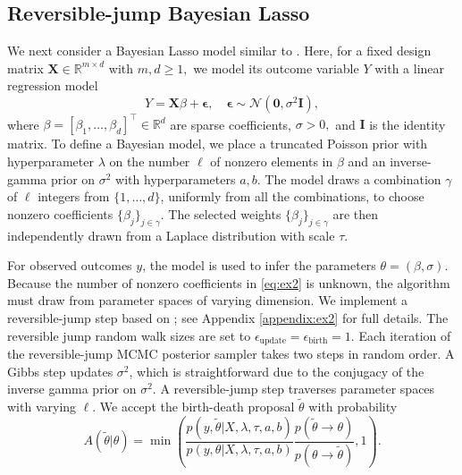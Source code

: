 \documentclass{article}
\begin{document}
\subsection{Reversible-jump Bayesian Lasso}
\label{section:ex2}
We next consider a Bayesian Lasso model similar to \cite{chen_bayesian_2011}. 
Here, for a fixed design matrix $\mathbf{X}\in \mathbb{R}^{m\times d}$ with $m, d \geq 1,$ we model its outcome variable $Y$ with  
a linear regression model
\begin{equation}
    Y = \mathbf{X}{\beta} + \mathbf{\epsilon}, \quad \mathbf{\epsilon} \sim \mathcal{N}(\mathbf{0}, \sigma^{2} \mathbf{I}), 
    \label{eq:ex2}
\end{equation}
where ${\beta} = [\beta_1, \dots, \beta_d]^{\top} \in \mathbb{R}^d$ are sparse coefficients, $\sigma>0,$ and $\mathbf{I}$ is the identity matrix. 
To define a Bayesian model, we place a truncated Poisson prior with hyperparameter $\lambda$ on the number $\ell$ of nonzero elements in $\beta$ and an inverse-gamma prior on $\sigma^{2}$ with hyperparameters $a, b$. 
The model draws a combination $\gamma$ of $\ell$ integers from $\{1,\dots, d\}$, uniformly from all the combinations, to choose nonzero coefficients $\{\beta_{j}\}_{j\in \gamma}$.
The selected weights $\{\beta_{j}\}_{j\in \gamma}$ are then independently drawn from a Laplace distribution with scale $\tau$. 

For observed outcomes $y$, the model is used to infer the parameters $\theta = (\beta, \sigma)$.
Because the number of nonzero coefficients in \eqref{eq:ex2} is unknown, the algorithm must draw from parameter spaces of varying dimension. 
We implement a reversible-jump step \citep{green_reversible_1995} based on \cite{chen_bayesian_2011}; see Appendix \ref{appendix:ex2} for full details. 
The reversible jump random walk sizes are set to $\epsilon_\text{update}= \epsilon_\text{birth}=1$. Each iteration of the reversible-jump MCMC posterior sampler takes two steps in random order. A Gibbs step updates $\sigma^{2}$, which is straightforward due to the conjugacy of the inverse gamma prior on $\sigma^{2}$. A reversible-jump step traverses parameter spaces with varying $\ell$. 
We accept the birth-death proposal $\tilde{\theta}$ with probability 
\begin{equation}
    A(\tilde{\theta}|\theta) = \min{\left(\frac{p(y, \tilde{\theta} | X, \lambda, \tau, a, b)}{p(y, \theta | X, \lambda, \tau, a, b )} \frac{p(\tilde{\theta} \rightarrow \theta)}{p(\theta \rightarrow \tilde{\theta})}, 1\right)}.
\end{equation}
\end{document}
